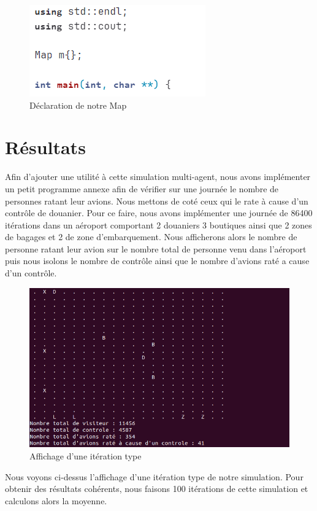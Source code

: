 \documentclass[12pt,french]{article} %
\begin{document}
\begin{figure}[H]
	\centering
	\includegraphics[scale=1]{map.png}
	\caption{Déclaration de notre Map}    
\end{figure}
\section{Résultats}

Afin d'ajouter une utilité à cette simulation multi-agent, nous avons implémenter un petit programme annexe afin de vérifier sur une journée le nombre de personnes ratant leur avions. Nous mettons de coté ceux qui le rate à cause d'un contrôle de douanier. Pour ce faire, nous avons implémenter une journée de 86400 itérations dans un aéroport comportant 2 douaniers 3 boutiques ainsi que 2 zones de bagages et 2 de zone d'embarquement. Nous afficherons alors le nombre de personne ratant leur avion sur le nombre total de personne venu dans l'aéroport puis nous isolons le nombre de contrôle ainsi que le nombre d'avions raté a cause d'un contrôle. 



\begin{figure}[H]
	\centering
	\includegraphics[scale=0.6]{ite.png}
	\caption{Affichage d'une itération type}    
\end{figure}

Nous voyons ci-dessus l'affichage d'une itération type de notre simulation. Pour obtenir des résultats cohérents, nous faisons 100 itérations de cette simulation et calculons alors la moyenne.  
\newline
\end{document}

